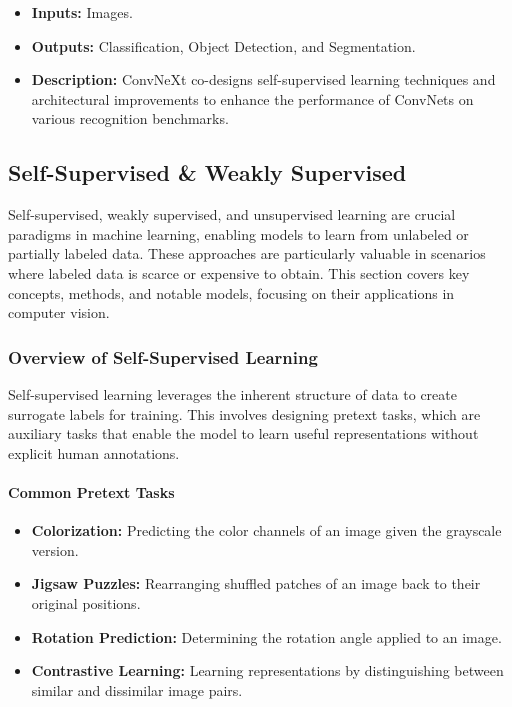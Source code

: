 \documentclass[12pt]{article}
\begin{document}
\begin{itemize}
    \item \textbf{Inputs:} Images.
    \item \textbf{Outputs:} Classification, Object Detection, and Segmentation.
    \item \textbf{Description:} ConvNeXt co-designs self-supervised learning techniques and architectural improvements to enhance the performance of ConvNets on various recognition benchmarks.
\end{itemize}

\subsection{Self-Supervised \& Weakly Supervised}

Self-supervised, weakly supervised, and unsupervised learning are crucial paradigms in machine learning, enabling models to learn from unlabeled or partially labeled data. These approaches are particularly valuable in scenarios where labeled data is scarce or expensive to obtain. This section covers key concepts, methods, and notable models, focusing on their applications in computer vision.

\subsubsection{Overview of Self-Supervised Learning}

Self-supervised learning leverages the inherent structure of data to create surrogate labels for training. This involves designing pretext tasks, which are auxiliary tasks that enable the model to learn useful representations without explicit human annotations.

\paragraph{Common Pretext Tasks}

\begin{itemize}
    \item \textbf{Colorization:} Predicting the color channels of an image given the grayscale version.
    \item \textbf{Jigsaw Puzzles:} Rearranging shuffled patches of an image back to their original positions.
    \item \textbf{Rotation Prediction:} Determining the rotation angle applied to an image.
    \item \textbf{Contrastive Learning:} Learning representations by distinguishing between similar and dissimilar image pairs.
\end{itemize}
\end{document}
